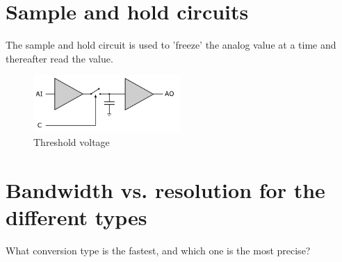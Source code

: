 \newpage
\section{Sample and hold circuits}
The sample and hold circuit is used to 'freeze' the analog value at a time and thereafter read the value.
\begin{figure}[h!]		%
	\begin{centering}
 		\includegraphics[width=0.5\textwidth]{images/sample_hold.png}
		\caption{Threshold voltage }
	\end{centering}
\end{figure}

\newpage
\section{Bandwidth vs. resolution for the different types}
What conversion type is the fastest, and which one is the most precise?



